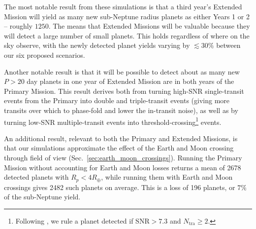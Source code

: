 The most notable result from these simulations is that a third year's Extended Mission will yield as many new sub-Neptune radius planets as either Years 1 or 2 -- roughly $1250$.
The means that Extended Missions will be valuable because they will detect a large number of small planets.
This holds regardless of where on the sky observe, with the newly detected planet yields varying by $\lesssim 30\%$ between our six proposed scenarios.

Another notable result is that it will be possible to detect about as many new $P>20$ day planets in one year of \tesss Extended Mission are in both years of the Primary Mission.
This result derives both from turning high-SNR single-transit events from the Primary into double and triple-transit events (giving more transits over which to phase-fold and lower the in-transit noise), as well as by turning low-SNR multiple-transit events into threshold-crossing\footnote{Following \citet{Sullivan_2015}, we rule a planet detected if $\mathrm{SNR} > 7.3$ and $N_\mathrm{tra}\geq 2$.} events.

An additional result, relevant to both the Primary and Extended Missions, is that our simulations approximate the effect of the Earth and Moon crossing through \tesss field of view (Sec.~\ref{sec:earth_moon_crossings}).
Running the Primary Mission without accounting for Earth and Moon losses returns a mean of 2678 detected planets with $R_p<4R_\oplus$, while running them with Earth and Moon crossings gives 2482 such planets on average.
This is a loss of 196 planets, or $7\%$ of the sub-Neptune yield.



